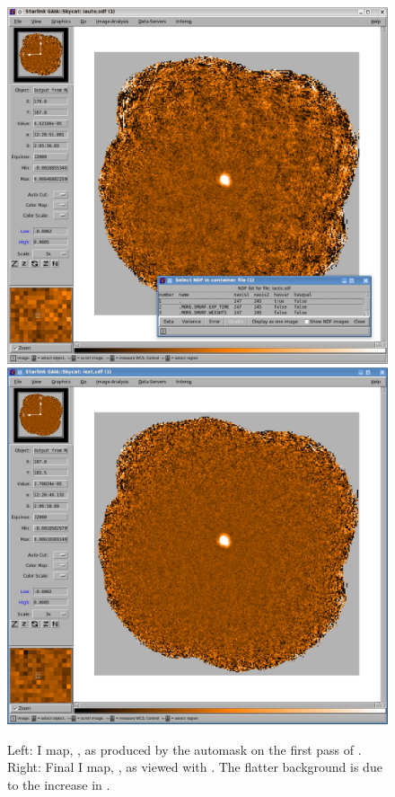 \begin{figure}[t!]
\begin{center}
\includegraphics[width=0.46\linewidth]{sc22-gaia-view-iauto.png}
\includegraphics[width=0.46\linewidth]{sc22-gaia-view-iext.png}
\label{fig:gaia-iext}
\caption [Final I map in GAIA]{
  \small Left: I map, , as produced by the automask on the first pass
         of \poltwomap. Right: Final I map, , as viewed with \GAIA.
         The flatter background is due to the increase in .
}
\end{center}
\end{figure}


